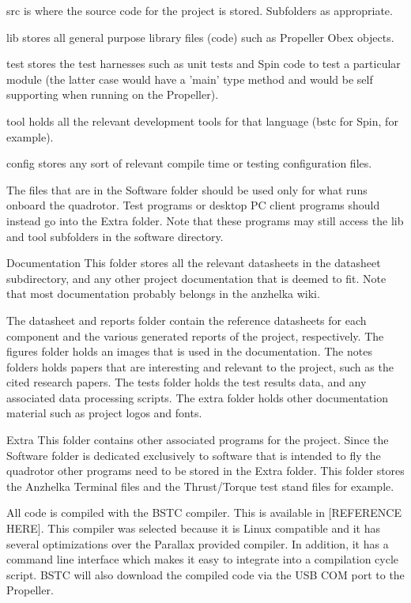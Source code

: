 \documentclass{article}
\numberwithin{equation}{section} %
\begin{document}
\begin{list}{*}{}
	\item src is where the source code for the project is stored. Subfolders as appropriate. 
	\item lib stores all general purpose library files (code) such as Propeller Obex objects. 
	\item test stores the test harnesses such as unit tests and Spin code to test a particular module (the latter case would have a 'main' type method and would be self supporting when running on the Propeller). 
	\item tool holds all the relevant development tools for that language (bstc for Spin, for example). 
	\item config stores any sort of relevant compile time or testing configuration files. 
\end{list}
The files that are in the Software folder should be used only for what runs onboard the quadrotor. Test programs or desktop PC client programs should instead go into the Extra folder. Note that these programs may still access the lib and tool subfolders in the software directory. 

Documentation 
This folder stores all the relevant datasheets in the datasheet subdirectory, and any other project documentation that is deemed to fit. Note that most documentation probably belongs in the anzhelka wiki. 

The datasheet and reports folder contain the reference datasheets for each component and the various generated reports of the project, respectively. The figures folder holds an images that is used in the documentation. The notes folders holds papers that are interesting and relevant to the project, such as the cited research papers. The tests folder holds the test results data, and any associated data processing scripts. The extra folder holds other documentation material such as project logos and fonts. 

Extra 
This folder contains other associated programs for the project. Since the Software folder is dedicated exclusively to software that is intended to fly the quadrotor other programs need to be stored in the Extra folder. This folder stores the Anzhelka Terminal files and the Thrust/Torque test stand files for example.

All code is compiled with the BSTC compiler. This is available in [REFERENCE HERE]. This compiler was selected because it is Linux compatible and it has several optimizations over the Parallax provided compiler. In addition, it has a command line interface which makes it easy to integrate into a compilation cycle script. BSTC will also download the compiled code via the USB COM port to the Propeller.
\end{document}
